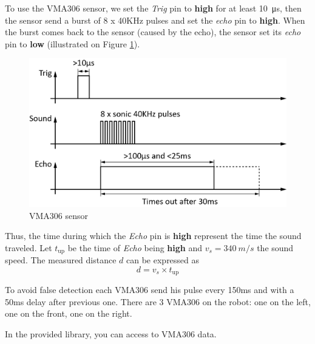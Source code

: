 To use the VMA306 sensor, we set the \textit{Trig} pin to \textbf{high} for at least \SI{10}{\micro s}, then the sensor send a burst of 8 x 40KHz pulses and set the \textit{echo} pin to \textbf{high}. When the burst comes back to the sensor (caused by the echo), the sensor set its \textit{echo} pin to \textbf{low} (illustrated on Figure \ref{fig:vma306}).

\begin{figure}[!ht]
 \centering
 \includegraphics[width=.5\textwidth]{images/echo_vma}
 \caption{VMA306 sensor}
 \label{fig:vma306}
\end{figure}

Thus, the time during which the \textit{Echo} pin is \textbf{high} represent the time the sound traveled.
Let $t_{\text{up}}$ be the time of \textit{Echo} being \textbf{high} and $v_s = \SI{340}{m/s}$ the sound speed. The measured distance $d$ can be expressed as \[ d = v_s \times t_{\text{up}} \]



To avoid false detection each VMA306 send his pulse every 150ms and with a 50ms delay after previous one.
There are 3 VMA306 on the robot: one on the left, one on the front, one on  the right.

In the provided library, you can access to VMA306 data.
